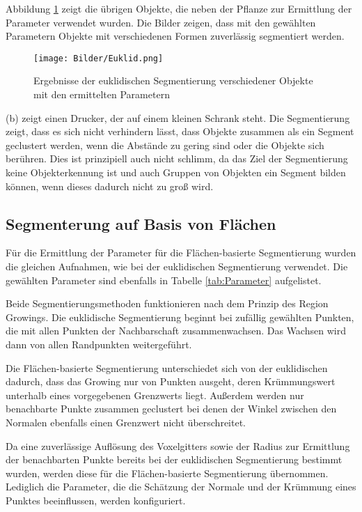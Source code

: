 Abbildung \ref{fig:euklid} zeigt die übrigen Objekte, die neben der Pflanze zur Ermittlung der Parameter verwendet wurden. Die Bilder zeigen, dass mit den gewählten Parametern Objekte mit verschiedenen Formen zuverlässig segmentiert werden. 

\begin{figure}[hp]
	\centering
	\texttt{[image: Bilder/Euklid.png]}
	\caption{Ergebnisse der euklidischen Segmentierung verschiedener Objekte mit den ermittelten Parametern}
	\label{fig:euklid}
\end{figure}

(b) zeigt einen Drucker, der auf einem kleinen Schrank steht. Die Segmentierung zeigt, dass es sich nicht verhindern lässt, dass Objekte zusammen als ein Segment geclustert werden, wenn die Abstände zu gering sind oder die Objekte sich berühren. Dies ist prinzipiell auch nicht schlimm, da das Ziel der Segmentierung keine Objekterkennung ist und auch Gruppen von Objekten ein Segment bilden können, wenn dieses dadurch nicht zu groß wird. 

\subsection[Segmenterung auf Basis von Flächen (Schmelzer)]{Segmenterung auf Basis von Flächen}

Für die Ermittlung der Parameter für die Flächen-basierte Segmentierung wurden die gleichen Aufnahmen, wie bei der euklidischen Segmentierung verwendet. Die gewählten Parameter sind ebenfalls in Tabelle \ref{tab:Parameter} aufgelistet. 

Beide Segmentierungsmethoden funktionieren nach dem Prinzip des Region Growings. Die euklidische Segmentierung beginnt bei zufällig gewählten Punkten, die mit allen Punkten der Nachbarschaft zusammenwachsen. Das Wachsen wird dann von allen Randpunkten weitergeführt. 

Die Flächen-basierte Segmentierung unterschiedet sich von der euklidischen dadurch, dass das Growing nur von Punkten ausgeht, deren Krümmungswert unterhalb eines vorgegebenen Grenzwerts liegt. Außerdem werden nur benachbarte Punkte zusammen geclustert bei denen der Winkel zwischen den Normalen ebenfalls einen Grenzwert nicht überschreitet.  

Da eine zuverlässige Auflösung des Voxelgitters sowie der Radius zur Ermittlung der benachbarten Punkte bereits bei der euklidischen Segmentierung bestimmt wurden, werden diese für die Flächen-basierte Segmentierung übernommen. Lediglich die Parameter, die die Schätzung der Normale und der Krümmung eines Punktes beeinflussen, werden konfiguriert. 

